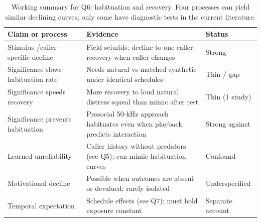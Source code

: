 \begin{table}[tbp]
\centering
\footnotesize
\singlespacing
\caption{Working summary for Q6: habituation and recovery. Four processes can yield similar declining curves; only some have diagnostic tests in the current literature.}
\label{tab:summary-q6}
\begin{tabular}{@{}p{1.5in}p{3.7in}p{1.0in}@{}}
\toprule
\textbf{Claim or process} & \textbf{Evidence} & \textbf{Status} \\
\midrule
Stimulus-/caller-specific decline & Field sciurids: decline to one caller; recovery when caller changes & Strong \\
\addlinespace[2pt]
Significance slows habituation rate & Needs natural vs matched synthetic under identical schedules & Thin / gap \\
\addlinespace[2pt]
Significance speeds recovery & More recovery to loud natural distress squeal than mimic after rest & Thin (1 study) \\
\addlinespace[2pt]
Significance prevents habituation & Prosocial 50-kHz approach habituates even when playback predicts interaction & Strong against \\
\addlinespace[2pt]
Learned unreliability & Caller history without predators (see Q5); can mimic habituation curves & Confound \\
\addlinespace[2pt]
Motivational decline & Possible when outcomes are absent or devalued; rarely isolated & Underspecified \\
\addlinespace[2pt]
Temporal expectation & Schedule effects (see Q7); must hold exposure constant & Separate account \\
\bottomrule
\end{tabular}
\end{table}

